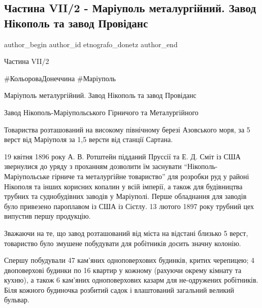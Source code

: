 
 
 
 
 

\subsection{Частина VII/2 - Маріуполь металургійний. Завод Нікополь та завод Провіданс}
\label{sec:08_05_2023.fb.etnografo_donetz.1.chastyna_vii_2_mariupol_metalurgijnyj_zavod_nikopol_ta_zavod_providans}

\ifcmt
 author_begin
   author_id etnografo_donetz
 author_end
\fi

Частина VII/2

\#КольороваДонеччина
\#Маріуполь

Маріуполь металургійний. Завод Нікополь та завод Провіданс

Завод Нікополь-Маріупольського Гірничого та Металургійного

Товариства розташований на високому північному березі Азовського моря, за 5
верст від Маріуполя за 1,5 версти від станції Сартана. 

19 квітня 1896 року А. В. Ротштейн підданий Пруссії та Е. Д. Сміт із США
звернулися до уряду з проханням дозволити їм заснувати
\enquote{Нікополь-Маріупольське гірниче та металургійне товариство} для
розробки руд у районі Нікополя та інших корисних копалин у всій імперії, а
також для будівництва трубних та суднобудівних заводів у Маріуполі. Перше
обладнання для заводів було привезено пароплавом із США із Сієтлу. 13 лютого
1897 року трубний цех випустив першу продукцію.

Зважаючи на те, що завод розташований від міста на відстані близько 5 верст,
товариство було змушене побудувати для робітників досить значну колонію.

Спершу побудували 47 кам'яних одноповерхових будинків, критих черепицею; 4
двоповерхові будинки по 16 квартир у кожному (рахуючи окрему кімнату та кухню),
а також 6 кам'яних одноповерхових казарм для не\hyp{}одружених робітників. Біля
кожного будиночка розбитий садок і влаштований загальний великий бульвар.

